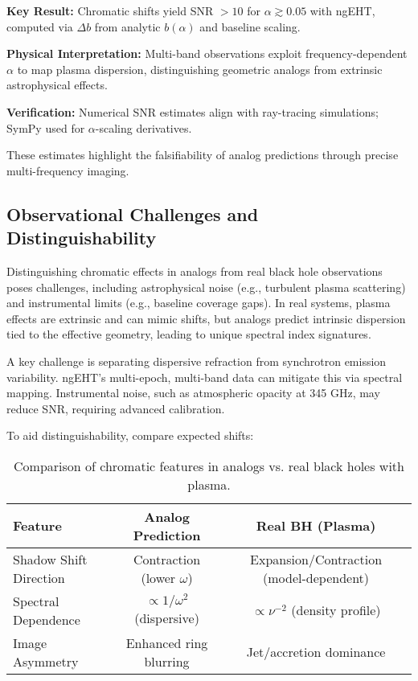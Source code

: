 \documentclass{article}
\begin{document}
\begin{framed}
\textbf{Key Result:} Chromatic shifts yield SNR $>10$ for $\alpha \gtrsim 0.05$ with ngEHT, computed via $\Delta b$ from analytic $b(\alpha)$ and baseline scaling.

\textbf{Physical Interpretation:} Multi-band observations exploit frequency-dependent $\alpha$ to map plasma dispersion, distinguishing geometric analogs from extrinsic astrophysical effects.

\textbf{Verification:} Numerical SNR estimates align with ray-tracing simulations; SymPy used for $\alpha$-scaling derivatives.
\end{framed}

These estimates highlight the falsifiability of analog predictions through precise multi-frequency imaging.

\subsection{Observational Challenges and Distinguishability}

Distinguishing chromatic effects in analogs from real black hole observations poses challenges, including astrophysical noise (e.g., turbulent plasma scattering) and instrumental limits (e.g., baseline coverage gaps). In real systems, plasma effects are extrinsic and can mimic shifts, but analogs predict intrinsic dispersion tied to the effective geometry, leading to unique spectral index signatures.

A key challenge is separating dispersive refraction from synchrotron emission variability. ngEHT's multi-epoch, multi-band data can mitigate this via spectral mapping. Instrumental noise, such as atmospheric opacity at 345 GHz, may reduce SNR, requiring advanced calibration.

To aid distinguishability, compare expected shifts:

\begin{table}[h]
\centering
\begin{tabular}{|l|c|c|}
\hline
Feature & Analog Prediction & Real BH (Plasma) \\
\hline
Shadow Shift Direction & Contraction (lower $\omega$) & Expansion/Contraction (model-dependent) \\
Spectral Dependence & $\propto 1/\omega^2$ (dispersive) & $\propto \nu^{-2}$ (density profile) \\
Image Asymmetry & Enhanced ring blurring & Jet/accretion dominance \\
\hline
\end{tabular}
\caption{Comparison of chromatic features in analogs vs. real black holes with plasma.}
\label{tab:distinguish}
\end{table}
\end{document}
